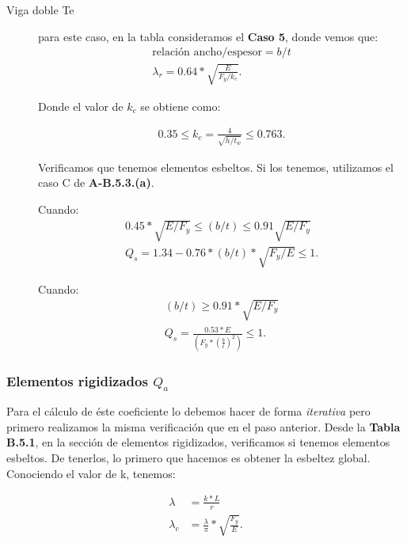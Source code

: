 \documentclass[../main.tex]{subfiles}
\begin{document}
\begin{description}
  \item[Viga doble Te] para este caso, en la tabla consideramos el \textbf{Caso 5}, donde vemos que:
    \begin{align*}    
      \text{relación ancho/espesor} =  b / t \\[5pt]
      \lambda_r = 0.64*\sqrt{\frac{E}{F_y / k_c}} 
    .\end{align*}

    Donde el valor de $k_c$ se obtiene como:

    \begin{align*}
      0.35 \leq k_c = \frac{4}{\sqrt{h / t_w}} \leq 0.763
    .\end{align*}

    Verificamos que tenemos elementos esbeltos. Si los tenemos, utilizamos el
    caso C de \textbf{A-B.5.3.(a)}. 
    
    Cuando:
    \begin{align*}
      0.45 * \sqrt{E / F_y} \leq (b/t) \leq 0.91 \sqrt{E / F_y}  \\[5pt]
      Q_s = 1.34 - 0.76*(b / t) * \sqrt{F_y / E} \leq 1 
    .\end{align*}

    Cuando:
    \begin{align*}
      (b / t) \geq 0.91 * \sqrt{E / F_y} \\[5pt] 
      Q_s = \frac{0.53 * E}{\left( F_y * \left(\frac{b}{t}  \right)^2  \right)} \leq 1 
    .\end{align*}
\end{description}

\subsubsection{Elementos rigidizados $Q_a$}

Para el cálculo de éste coeficiente lo debemos hacer de forma \textit{iterativa}
pero primero realizamos la misma verificación que en el paso anterior. Desde la
\textbf{Tabla B.5.1}, en la sección de elementos rigidizados, verificamos si
tenemos elementos esbeltos. De tenerlos, lo primero que hacemos es obtener la 
esbeltez global. Conociendo el valor de k, tenemos:

\begin{align*}
  \lambda &= \frac{k*L}{r} \\[5pt]
  \lambda_c &= \frac{\lambda}{\pi}*\sqrt{\frac{F_y}{E}} 
.\end{align*}
\end{document}
